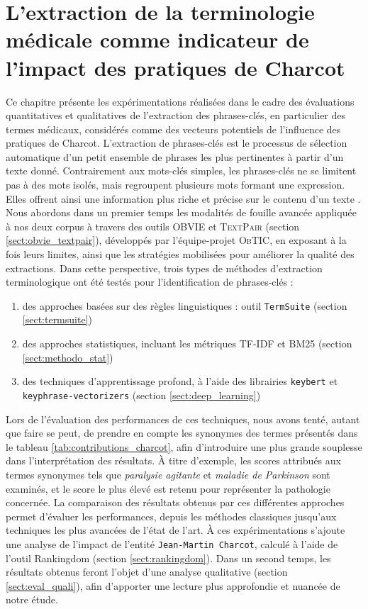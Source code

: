 \chapter{L'extraction de la terminologie médicale comme indicateur de l'impact des pratiques de Charcot}
\minitoc
\label{chap:resultats}

Ce chapitre présente les expérimentations réalisées dans le cadre des évaluations quantitatives et qualitatives de l'extraction des phrases-clés, en particulier des termes médicaux, considérés comme des vecteurs potentiels de l'influence des pratiques de Charcot. L'extraction de phrases-clés est le processus de sélection automatique d'un petit ensemble de phrases les plus pertinentes à partir d'un texte donné. Contrairement aux mots-clés simples, les phrases-clés ne se limitent pas à des mots isolés, mais regroupent plusieurs mots formant une expression. Elles offrent ainsi une information plus riche et précise sur le contenu d'un texte \citep{schopf2022}. Nous abordons dans un premier temps les modalités de fouille avancée appliquée à nos deux corpus à travers des outils \textsc{OBVIE} et \textsc{TextPair} (section \ref{sect:obvie_textpair}), développés par l'équipe-projet \textsc{ObTIC}, en exposant à la fois leurs limites, ainsi que les stratégies mobilisées pour améliorer la qualité des extractions. Dans cette perspective, trois types de méthodes d'extraction terminologique ont été testés pour l'identification de phrases-clés :
\begin{enumerate}
	\item des approches basées sur des règles linguistiques : outil \texttt{TermSuite} (section \ref{sect:termsuite})
	\item des approches statistiques, incluant les métriques \textsc{TF-IDF} et \textsc{BM25} (section \ref{sect:methodo_stat})
	\item des techniques d'apprentissage profond, à l'aide des librairies \texttt{keybert} et \texttt{keyphrase\allowbreak-vectorizers} (section \ref{sect:deep_learning})
\end{enumerate}


Lors de l'évaluation des performances de ces techniques, nous avons tenté, autant que faire se peut, de prendre en compte les synonymes des termes présentés dans le tableau \ref{tab:contributions_charcot}, afin d'introduire une plus grande souplesse dans l'interprétation des résultats. À titre d'exemple, les scores attribués aux termes synonymes tels que \textit{paralysie agitante} et \textit{maladie de Parkinson} sont examinés, et le score le plus élevé est retenu pour représenter la pathologie concernée. La comparaison des résultats obtenus par ces différentes approches permet d'évaluer les performances, depuis les méthodes classiques jusqu'aux techniques les plus avancées de l'état de l'art. À ces expérimentations s'ajoute une analyse de l'impact de l'entité \texttt{Jean-Martin Charcot}, calculé à l'aide de l'outil Rankingdom (section \ref{sect:rankingdom}).
Dans un second temps, les résultats obtenus feront l'objet d'une analyse qualitative (section \ref{sect:eval_quali}), afin d'apporter une lecture plus approfondie et nuancée de notre étude.
